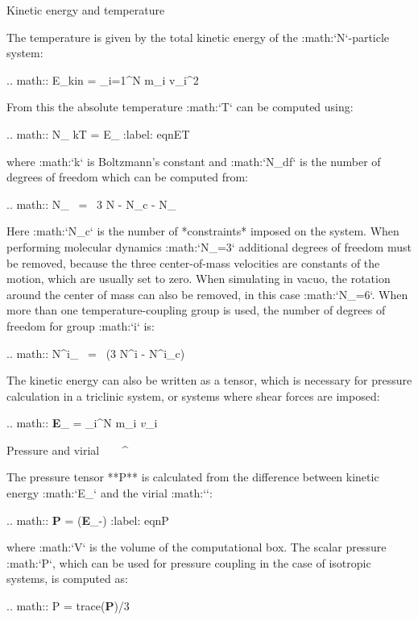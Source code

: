 Kinetic energy and temperature
^^^^^^^^^^^^^^^^^^^^^^^^^^^^^^

The temperature
is given by the total
kinetic
energy
of the :math:`N`-particle system:

.. math:: E_{kin} = {}\sum_{i=1}^N m_i v_i^2

From this the absolute temperature :math:`T` can be computed using:

.. math::  {}N_{} kT = E_{}
           :label: eqnET

where :math:`k` is Boltzmann’s constant and :math:`N_{df}` is the
number of degrees of freedom which can be computed from:

.. math:: N_{}  ~=~     3 N - N_c - N_{}

Here :math:`N_c` is the number of
*constraints*
imposed on the system.
When performing molecular dynamics :math:`N_{}=3` additional
degrees of freedom must be removed, because the three center-of-mass
velocities are constants of the motion, which are usually set to zero.
When simulating in vacuo, the rotation around the center of mass can
also be removed, in this case :math:`N_{}=6`. When more than
one temperature-coupling
group
is used, the number
of degrees of freedom for group :math:`i` is:

.. math:: N^i_{}  ~=~  (3 N^i - N^i_c) 

The kinetic energy can also be written as a tensor, which is necessary
for pressure calculation in a triclinic system, or systems where shear
forces are imposed:

.. math:: {\bf E}_{} = {}\sum_i^N m_i {{\mbox{\boldmath ${v}$}}_i}

Pressure and virial
^^^^^^^^^^^^^^^^^^^

The pressure
tensor **P** is calculated
from the difference between kinetic energy :math:`E_{}` and
the virial
:math:`{\bf \Xi}`:

.. math:: {\bf P} =  ({\bf E}_{}-{\bf \Xi})
          :label: eqnP

where :math:`V` is the volume of the computational box. The scalar
pressure :math:`P`, which can be used for pressure coupling in the case
of isotropic systems, is computed as:

.. math:: P       = {\rm trace}({\bf P})/3

